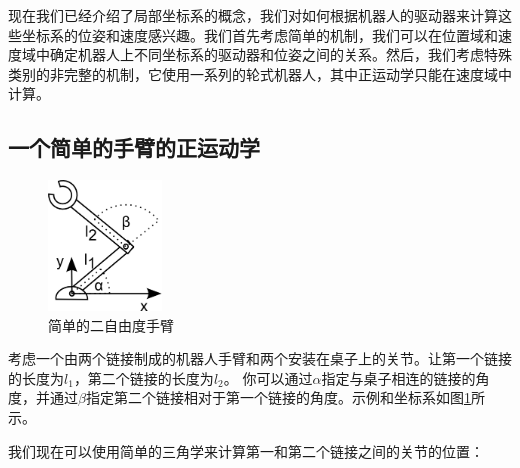 现在我们已经介绍了局部坐标系的概念，我们对如何根据机器人的驱动器来计算这些坐标系的位姿和速度感兴趣。我们首先考虑简单的机制，我们可以在位置域和速度域中确定机器人上不同坐标系的驱动器和位姿之间的关系。然后，我们考虑特殊类别的非完整的机制，它使用一系列的轮式机器人，其中正运动学只能在速度域中计算。

\subsection{一个简单的手臂的正运动学}
\begin{figure}[!htb]%
  \begin{center}
    \includegraphics[width=0.27\textwidth]{figs/fwk2dofarm}
  \end{center}
  \caption{简单的二自由度手臂}
  \label{fig:fwk2dofarm}
\end{figure}


考虑一个由两个链接制成的机器人手臂和两个安装在桌子上的关节。让第一个链接的长度为$l_1$，第二个链接的长度为$l_2$。 你可以通过$\alpha$指定与桌子相连的链接的角度，并通过$\beta$指定第二个链接相对于第一个链接的角度。示例和坐标系如图\ref{fig:fwk2dofarm}所示。


我们现在可以使用简单的三角学来计算第一和第二个链接之间的关节的位置：

